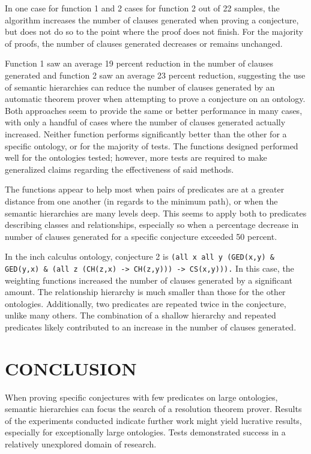 \documentclass{article}
\begin{document}
In one case for function 1 and 2 cases for function 2 out of 22 samples, the algorithm increases the number of clauses generated when proving a conjecture, but does not do so to the point where the proof does not finish. For the majority of proofs, the number of clauses generated decreases or remains unchanged.

Function 1 saw an average 19 percent reduction in the number of clauses generated and function 2 saw an average 23 percent reduction, suggesting the use of semantic hierarchies can reduce the number of clauses generated by an automatic theorem prover when attempting to prove a conjecture on an ontology. Both approaches seem to provide the same or better performance in many cases, with only a handful of cases where the number of clauses generated actually increased. Neither function performs significantly better than the other for a specific ontology, or for the majority of tests. The functions designed performed well for the ontologies tested; however, more tests are required to make generalized claims regarding the effectiveness of said methods. 

The functions appear to help most when pairs of predicates are at a greater distance from one another (in regards to the minimum path), or when the semantic hierarchies are many levels deep. This seems to apply both to predicates describing classes and relationships, especially so when a percentage decrease in number of clauses generated for a specific conjecture exceeded 50 percent. 

In the inch calculus ontology, conjecture 2 is \texttt{(all x all y (GED(x,y) \& GED(y,x) \& (all z (CH(z,x) -> CH(z,y))) -> CS(x,y))).} In this case, the weighting functions increased the number of clauses generated by a significant amount. The relationship hierarchy is much smaller than those for the other ontologies. Additionally, two predicates are repeated twice in the conjecture, unlike many others. The combination of a shallow hierarchy and repeated predicates likely contributed to an increase in the number of clauses generated. 

\newpage
\vspace*{.05in}
\section{\MakeUppercase{Conclusion}}

When proving specific conjectures with few predicates on large ontologies, semantic hierarchies can focus the search of a resolution theorem prover. Results of the experiments conducted indicate further work might yield lucrative results, especially for exceptionally large ontologies. Tests demonstrated success in a relatively unexplored domain of research. 
\end{document}
